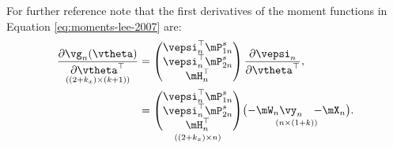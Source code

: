 For further reference note that the first derivatives of the moment functions in Equation \eqref{eq:moments-lee-2007} are:
\begin{equation}\label{eq:Jacobian-gmm-slm}
\begin{aligned}
\underset{((2 + k_x) \times (k + 1))}{\frac{\partial \vg_n(\vtheta)}{\partial \vtheta^\top}} & = \begin{pmatrix}
                                                      \vepsi_n^\top\mP_{1n}^s \\
                                                      \vepsi_n^\top\mP_{2n}^s \\
                                                      \mH_n^\top
                                                      \end{pmatrix}
                                                      \frac{\partial \vepsi_n}{\partial \vtheta^\top}, \\
                                                & =  \underset{((2 + k_x)\times n)}{\begin{pmatrix}
                                                      \vepsi_n^\top\mP_{1n}^s \\
                                                      \vepsi_n^\top\mP_{2n}^s \\
                                                      \mH_n^\top
                                                      \end{pmatrix}}
                                                    \underset{(n\times(1 + k))}{\begin{pmatrix}
                                                      -\mW_n\vy_n & -\mX_n
                                                    \end{pmatrix}}.
\end{aligned}
\end{equation}


